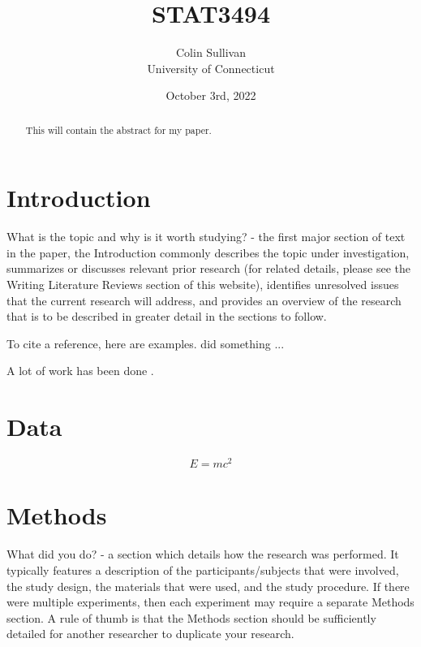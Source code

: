 \documentclass[12pt]{article}
\title{STAT3494}
\author{Colin Sullivan\\
University of Connecticut}
\date{October 3rd, 2022}
\begin{document}
\maketitle

\begin{abstract}

This will contain the abstract for my paper.
\lipsum[2]

\end{abstract}

\section{Introduction}

What is the topic and why is it worth studying? - the first major section of text in the paper, the Introduction commonly describes the topic under investigation, summarizes or discusses relevant prior research (for related details, please see the Writing Literature Reviews section of this website), identifies unresolved issues that the current research will address, and provides an overview of the research that is to be described in greater detail in the sections to follow.

\lipsum[1]

To cite a reference, here are examples.
\citet{xie2015dynamic} did something ... \lipsum[4]

A lot of work has been done \citep[e.g.,][]{xie2015dynamic}.

\lipsum[2]

\section{Data}

\begin{equation}
  \label{eq:mc2}
  E= m c^2
\end{equation}

\lipsum[3]


\section{Methods}

What did you do? - a section which details how the research was performed.  It typically features a description of the participants/subjects that were involved, the study design, the materials that were used, and the study procedure.  If there were multiple experiments, then each experiment may require a separate Methods section.  A rule of thumb is that the Methods section should be sufficiently detailed for another researcher to duplicate your research.
\end{document}
